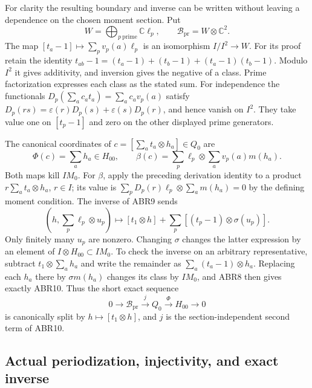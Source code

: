 For clarity the resulting boundary and inverse can be written
without leaving a dependence on the chosen moment section. Put
\begin{equation}\tag{ABR8}
 W=\bigoplus_{p\ \mathrm{prime}}\mathbb C\ell_p,
 \qquad \mathcal B_{\mathrm{pr}}=W\otimes\mathbb C^2.
\end{equation}
The map $[t_a-1]\mapsto\sum_pv_p(a)\ell_p$ is an isomorphism
$I/I^2\to W$. For its proof retain the identity
$t_{ab}-1=(t_a-1)+(t_b-1)+(t_a-1)(t_b-1)$.
Modulo $I^2$ it gives additivity, and inversion gives the negative
of a class. Prime factorization expresses each class as the stated
sum. For independence the functionals
$D_p(\sum_ac_at_a)=\sum_ac_av_p(a)$ satisfy
$D_p(rs)=\varepsilon(r)D_p(s)+\varepsilon(s)D_p(r)$, and hence
vanish on $I^2$. They take value one on $[t_p-1]$ and zero on
the other displayed prime generators.

The canonical coordinates of $c=[\sum_at_a\otimes h_a]\in Q_0$
are
\begin{equation}\tag{ABR9}
 \Phi(c)=\sum_a h_a\in H_{00},\qquad
 \beta(c)=\sum_p\ell_p\otimes\sum_a v_p(a)m(h_a).
\end{equation}
Both maps kill $IM_0$. For $\beta$, apply the preceding derivation
identity to a product $r\sum_at_a\otimes h_a$, $r\in I$;
its value is $\sum_pD_p(r)\ell_p\otimes\sum_am(h_a)=0$ by
the defining moment condition. The inverse of ABR9 sends
\begin{equation}\tag{ABR10}
 (h,\sum_p\ell_p\otimes u_p)
 \longmapsto [t_1\otimes h]
             +\sum_p[(t_p-1)\otimes\sigma(u_p)].
\end{equation}
Only finitely many $u_p$ are nonzero. Changing $\sigma$ changes
the latter expression by an element of $I\otimes H_{00}\subset IM_0$.
To check the inverse on an arbitrary representative, subtract
$t_1\otimes\sum_a h_a$ and write the remainder as
$\sum_a(t_a-1)\otimes h_a$. Replacing each $h_a$ there by
$\sigma m(h_a)$ changes its class by $IM_0$, and ABR8 then
gives exactly ABR10. Thus the short exact sequence
\begin{equation}\tag{ABR11}
 0\longrightarrow\mathcal B_{\mathrm{pr}}
   \xrightarrow{\ j\ }Q_0\xrightarrow{\Phi}H_{00}
   \longrightarrow0
\end{equation}
is canonically split by $h\mapsto[t_1\otimes h]$, and $j$ is
the section-independent second term of ABR10.

\subsection{Actual periodization, injectivity, and exact inverse}

